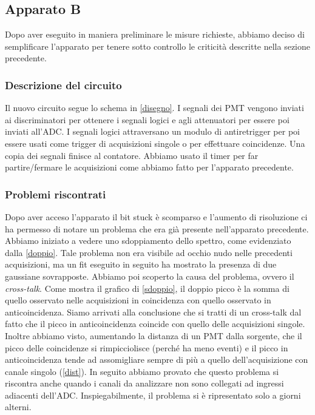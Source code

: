 \subsection{Apparato B}

Dopo aver eseguito in maniera preliminare le misure richieste, abbiamo deciso di semplificare l'apparato per tenere sotto controllo le criticità descritte nella sezione precedente.

\subsubsection{Descrizione del circuito}

Il nuovo circuito segue lo schema in \autoref{disegno}.
I segnali dei PMT vengono inviati ai discriminatori per ottenere i segnali logici e agli attenuatori per essere poi inviati all'ADC. I segnali logici attraversano un modulo di antiretrigger per poi essere usati come trigger di acquisizioni singole o per effettuare coincidenze. Una copia dei segnali finisce al contatore. Abbiamo usato il timer per far partire/fermare le acquisizioni come abbiamo fatto per l'apparato precedente.

\subsubsection{Problemi riscontrati}

Dopo aver acceso l'apparato il bit stuck è scomparso e l'aumento di risoluzione ci ha permesso di notare un problema che era già presente nell'apparato precedente. Abbiamo iniziato a vedere uno sdoppiamento dello spettro, come evidenziato dalla \autoref{doppio}. Tale problema non era visibile ad occhio nudo nelle precedenti acquisizioni, ma un fit eseguito in seguito ha mostrato la presenza di due gaussiane sovrapposte. Abbiamo poi scoperto la causa del problema, ovvero il \emph{cross-talk}.
Come mostra il grafico di \autoref{sdoppio}, il doppio picco è la somma di quello osservato nelle acquisizioni in coincidenza con quello osservato in anticoincidenza. Siamo arrivati alla conclusione che si tratti di un cross-talk dal fatto che il picco in anticoincidenza coincide con quello delle acquisizioni singole. Inoltre abbiamo visto, aumentando la distanza di un PMT dalla sorgente, che il picco delle coincidenze si rimpicciolisce (perché ha meno eventi) e il picco in anticoincidenza tende ad assomigliare sempre di più a quello dell'acquisizione con canale singolo (\autoref{dist}). In seguito abbiamo provato che questo problema si riscontra anche quando i canali da analizzare non sono collegati ad ingressi adiacenti dell'ADC. Inspiegabilmente, il problema si è ripresentato solo a giorni alterni. 

